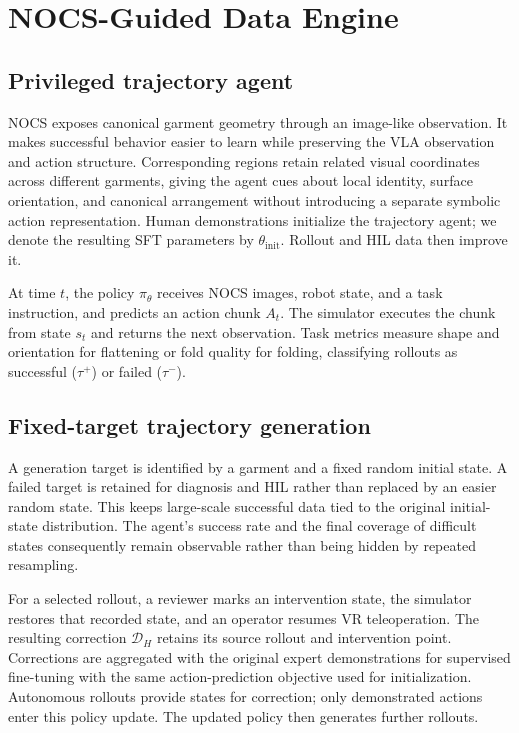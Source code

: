 \section{NOCS-Guided Data Engine}
\label{sec:data-engine}

\subsection{Privileged trajectory agent}

NOCS exposes canonical garment geometry through an image-like observation. It
makes successful behavior easier to learn while preserving the VLA observation
and action structure. Corresponding regions retain related visual coordinates
across different garments, giving the agent cues about local identity, surface
orientation, and canonical arrangement without introducing a separate symbolic
action representation. Human demonstrations initialize the trajectory agent;
we denote the resulting SFT parameters by $\theta_{\mathrm{init}}$. Rollout and
HIL data then improve it.

At time $t$, the policy $\pi_\theta$ receives NOCS images, robot state, and a
task instruction, and predicts an action chunk $A_t$. The simulator executes
the chunk from state $s_t$ and returns the next observation. Task metrics
measure shape and orientation for flattening or fold quality for folding,
classifying rollouts as successful ($\tau^+$) or failed ($\tau^-$).

\subsection{Fixed-target trajectory generation}

A generation target is identified by a garment and a fixed random initial
state. A failed target is retained for diagnosis and HIL rather than replaced
by an easier random state. This keeps large-scale successful data tied to the
original initial-state distribution. The agent's success rate and the final
coverage of difficult states consequently remain observable rather than being
hidden by repeated resampling.

For a selected rollout, a reviewer marks an intervention state, the simulator
restores that recorded state, and an operator resumes VR teleoperation. The
resulting correction $\mathcal{D}_H$ retains its source rollout and intervention
point. Corrections are aggregated with the original expert demonstrations for
supervised fine-tuning with the same action-prediction objective used for
initialization. Autonomous rollouts provide states for correction; only
demonstrated actions enter this policy update. The updated policy then
generates further rollouts.

